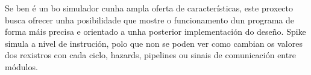 Se ben é un bo simulador cunha ampla oferta de características, este proxecto busca ofrecer unha posibilidade que mostre o funcionamento dun programa de forma máis precisa e orientado a unha posterior implementación do deseño. Spike simula a nivel de instrución, polo que non se poden ver como cambian os valores dos rexistros con cada ciclo, hazards, pipelines ou sinais de comunicación entre módulos.

